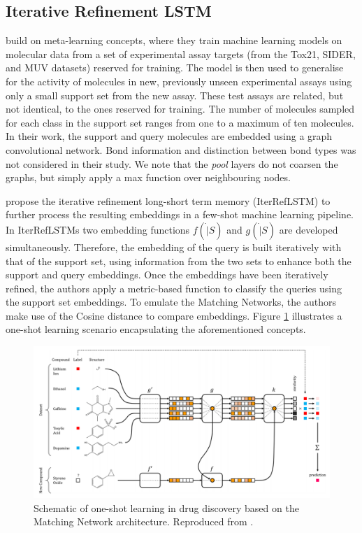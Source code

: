 \subsection{Iterative Refinement LSTM}

\citet{altae2017low} build on meta-learning concepts, where they train machine learning models on molecular data from a set of experimental assay targets (from the Tox21, SIDER, and MUV datasets) reserved for training. The model is then used to generalise for the activity of molecules in new, previously unseen experimental assays using only a small support set from the new assay. These test assays are related, but not identical, to the ones reserved for training. The number of molecules sampled for each class in the support set ranges from one to a maximum of ten molecules. In their work, the support and query molecules are embedded using a graph convolutional network.  Bond information and distinction between bond types was not considered in their study. We note that the \textit{pool} layers do not coarsen the graphs, but simply apply a max function over neighbouring nodes.

\citet{altae2017low} propose the iterative refinement long-short term memory (IterRefLSTM) to further process the resulting embeddings in a few-shot machine learning pipeline. In IterRefLSTMs two embedding functions $f(\dot|S)$ and $g(\dot|S)$ are developed simultaneously. Therefore, the embedding of the query is built iteratively with that of the support set, using information from the two sets to enhance both the support and query embeddings. Once the embeddings have been iteratively refined, the authors apply a metric-based function to classify the queries using the support set embeddings. To emulate the Matching Networks, the authors make use of the Cosine distance to compare embeddings. Figure \ref{fig:schematiconeshotdrug} illustrates a one-shot learning scenario encapsulating the aforementioned concepts.

\begin{figure}[h]
	\centering
	\includegraphics[width=0.9\linewidth]{img/pandeschematic.png}
	\caption[Schematic of one-shot learning in drug discovery]{Schematic of one-shot learning in drug discovery based on the Matching Network \citep{vinyals2016matching} architecture. Reproduced from \citet{altae2017low}.}
	\label{fig:schematiconeshotdrug}
\end{figure}

